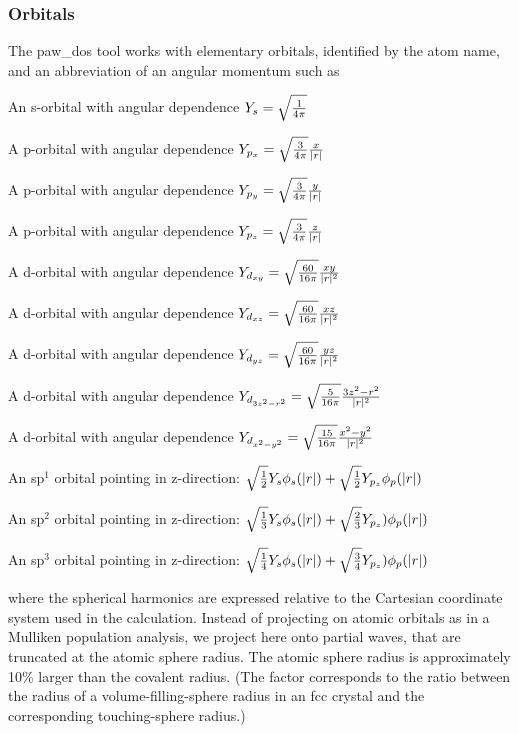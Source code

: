 \documentclass[final,12pt]{article}
\begin{document}
{{{{\subsubsection{Orbitals}

The paw\_dos tool works with elementary orbitals, identified by the atom
name, and an abbreviation of an angular momentum such as
\begin{description}
\item[s]An s-orbital with angular dependence 
$Y_s=\sqrt{1\over{4\pi}}$
\item[px]A p-orbital with angular dependence 
$Y_{p_x}=\sqrt{3\over{4\pi}} {x\over{|r|}}$
\item[py]A p-orbital with angular dependence 
$Y_{p_y}=\sqrt{3\over{4\pi}} {y\over{|r|}}$
\item[pz]A p-orbital with angular dependence 
$Y_{p_z}=\sqrt{3\over{4\pi}} {z\over{|r|}}$
\item[dxy]A d-orbital with angular dependence 
$Y_{d_{xy}}=\sqrt{60\over{16\pi}} {{xy}\over{|r|^2}}$
\item[dxz]A d-orbital with angular dependence 
$Y_{d_{xz}}=\sqrt{60\over{16\pi}} {{xz}\over{|r|^2}}$
\item[dyz]A d-orbital with angular dependence 
$Y_{d_{yz}}=\sqrt{60\over{16\pi}} {{yz}\over{|r|^2}}$
\item[d3z2-r2]A d-orbital with angular dependence 
$Y_{d_{3z^2-r^2}}=\sqrt{5\over{16\pi}} {{3z^2-r^2}\over{|r|^2}}$
\item[dx2-y2]A d-orbital with angular dependence 
$Y_{d_{x^2-y^2}}=\sqrt{15\over{16\pi}} {{x^2-y^2}\over{|r|^2}}$
\item[sp] An sp$^1$ orbital pointing in z-direction: 
$\sqrt{1\over{2}}Y_s \phi_s(|r|) + \sqrt{1\over{2}}Y_{p_z}\phi_p(|r|)$
\item[sp2] An sp$^2$ orbital pointing in z-direction: 
$\sqrt{1\over{3}}Y_s\phi_s(|r|) + \sqrt{2\over{3}}Y_{p_z})\phi_p(|r|)$
\item[sp3] An sp$^3$ orbital pointing in z-direction: 
$\sqrt{1\over{4}}Y_s\phi_s(|r|) + \sqrt{3\over{4}}Y_{p_z})\phi_p(|r|)$
\item
\end{description}
where the spherical harmonics are expressed relative to the Cartesian
coordinate system used in the calculation. Instead of projecting on
atomic orbitals as in a Mulliken population analysis, we project here
onto partial waves, that are truncated at the atomic sphere radius.
The atomic sphere radius is approximately 10\% larger than the
covalent radius. (The factor corresponds to the ratio between the
radius of a volume-filling-sphere radius in an fcc crystal and the
corresponding touching-sphere radius.)

}}}}
\end{document}
